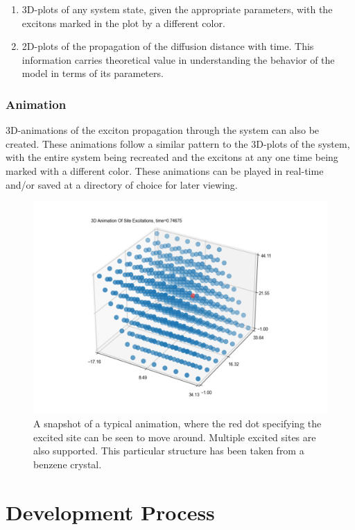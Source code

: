 \documentclass{article}
\begin{document}
\begin{enumerate}
    \item 3D-plots of any system state, given the appropriate parameters, with the excitons marked in the plot by a different color. 
    \item 2D-plots of the propagation of the diffusion distance with time. This information carries theoretical value in understanding the behavior of the model in terms of its parameters.
\end{enumerate}
\subsubsection{Animation}
3D-animations of the exciton propagation through the system can also be created. These animations follow a similar pattern to the 3D-plots of the system, with the entire system being recreated and the excitons at any one time being marked with a different color. These animations can be played in real-time and/or saved at a directory of choice for later viewing.

\begin{figure}[H]
    \centering
    \includegraphics[width=1.0\textwidth]{anim_pic.png}
    \caption{A snapshot of a typical animation, where the red dot specifying the excited site can be seen to move around. Multiple excited sites are also supported. This particular structure has been taken from a benzene crystal.}
    \label{fig:anim_pic}
\end{figure}

\section{Development Process}
\end{document}
